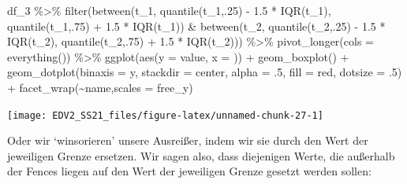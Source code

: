 \documentclass[
]{book}
\newenvironment{Shaded}{\begin{snugshade}}{\end{snugshade}}
\newcommand{\AttributeTok}[1]{\textcolor[rgb]{0.77,0.63,0.00}{#1}}
\newcommand{\DecValTok}[1]{\textcolor[rgb]{0.00,0.00,0.81}{#1}}
\newcommand{\FloatTok}[1]{\textcolor[rgb]{0.00,0.00,0.81}{#1}}
\newcommand{\FunctionTok}[1]{\textcolor[rgb]{0.00,0.00,0.00}{#1}}
\newcommand{\NormalTok}[1]{#1}
\newcommand{\SpecialCharTok}[1]{\textcolor[rgb]{0.00,0.00,0.00}{#1}}
\newcommand{\StringTok}[1]{\textcolor[rgb]{0.31,0.60,0.02}{#1}}
\begin{document}
\begin{Shaded}
\begin{Highlighting}[]
\NormalTok{df\_3 }\SpecialCharTok{\%\textgreater{}\%} 
  \FunctionTok{filter}\NormalTok{(}\FunctionTok{between}\NormalTok{(t\_1, }
                 \FunctionTok{quantile}\NormalTok{(t\_1,.}\DecValTok{25}\NormalTok{) }\SpecialCharTok{{-}} \FloatTok{1.5} \SpecialCharTok{*} \FunctionTok{IQR}\NormalTok{(t\_1),}
                 \FunctionTok{quantile}\NormalTok{(t\_1,.}\DecValTok{75}\NormalTok{) }\SpecialCharTok{+} \FloatTok{1.5} \SpecialCharTok{*} \FunctionTok{IQR}\NormalTok{(t\_1)) }\SpecialCharTok{\&}
           \FunctionTok{between}\NormalTok{(t\_2, }
                 \FunctionTok{quantile}\NormalTok{(t\_2,.}\DecValTok{25}\NormalTok{) }\SpecialCharTok{{-}} \FloatTok{1.5} \SpecialCharTok{*} \FunctionTok{IQR}\NormalTok{(t\_2),}
                 \FunctionTok{quantile}\NormalTok{(t\_2,.}\DecValTok{75}\NormalTok{) }\SpecialCharTok{+} \FloatTok{1.5} \SpecialCharTok{*} \FunctionTok{IQR}\NormalTok{(t\_2))) }\SpecialCharTok{\%\textgreater{}\%} 
  \FunctionTok{pivot\_longer}\NormalTok{(}\AttributeTok{cols =} \FunctionTok{everything}\NormalTok{()) }\SpecialCharTok{\%\textgreater{}\%} 
  \FunctionTok{ggplot}\NormalTok{(}\FunctionTok{aes}\NormalTok{(}\AttributeTok{y =}\NormalTok{ value, }\AttributeTok{x =} \StringTok{\textquotesingle{}\textquotesingle{}}\NormalTok{)) }\SpecialCharTok{+}
  \FunctionTok{geom\_boxplot}\NormalTok{() }\SpecialCharTok{+}
  \FunctionTok{geom\_dotplot}\NormalTok{(}\AttributeTok{binaxis =} \StringTok{\textquotesingle{}y\textquotesingle{}}\NormalTok{,}
               \AttributeTok{stackdir =} \StringTok{\textquotesingle{}center\textquotesingle{}}\NormalTok{,}
               \AttributeTok{alpha =}\NormalTok{ .}\DecValTok{5}\NormalTok{,}
               \AttributeTok{fill =} \StringTok{\textquotesingle{}red\textquotesingle{}}\NormalTok{,}
               \AttributeTok{dotsize =}\NormalTok{ .}\DecValTok{5}\NormalTok{) }\SpecialCharTok{+}
  \FunctionTok{facet\_wrap}\NormalTok{(}\SpecialCharTok{\textasciitilde{}}\NormalTok{name,}\AttributeTok{scales =} \StringTok{\textquotesingle{}free\_y\textquotesingle{}}\NormalTok{)}
\end{Highlighting}
\end{Shaded}

\begin{center}\texttt{[image: EDV2\_SS21\_files/figure-latex/unnamed-chunk-27-1]} \end{center}

Oder wir `winsorieren' unsere Ausreißer, indem wir sie durch den Wert der jeweiligen Grenze ersetzen.
Wir sagen also, dass diejenigen Werte, die außerhalb der Fences liegen auf den Wert der jeweiligen Grenze gesetzt werden sollen:
\end{document}
